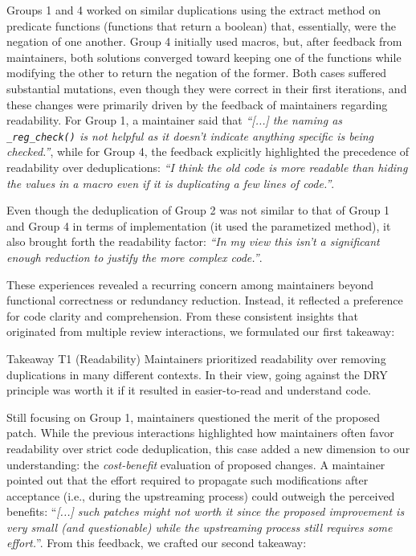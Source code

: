 \documentclass[10pt,conference]{IEEEtran}
\newenvironment{highlight-box}[1]{%
  \begin{tcolorbox}[colback=gray!10, colframe=gray!50!black, boxrule=0.5pt,
                    left=1mm, right=1mm, top=1mm, bottom=1mm, sharp corners]
  \textbf{#1:} \itshape}{\end{tcolorbox}}
\begin{document}
Groups 1 and 4 worked on similar duplications using the extract method on predicate functions (functions that return a boolean) that, essentially, were the negation of one another. Group 4 initially used macros, but, after feedback from maintainers, both solutions converged toward keeping one of the functions while modifying the other to return the negation of the former. Both cases suffered substantial mutations, even though they were correct in their first iterations, and these changes were primarily driven by the feedback of maintainers regarding readability. For Group 1, a maintainer said that \textit{``[...] the naming as \texttt{\_reg\_check()} is not helpful as it doesn't indicate anything specific is being checked.''}, while for Group 4, the feedback explicitly highlighted the precedence of readability over deduplications: \textit{``I think the old code is more readable than hiding the values in a macro even if it is duplicating a few lines of code.''}.

Even though the deduplication of Group 2 was not similar to that of Group 1 and Group 4 in terms of implementation (it used the parametized method), it also brought forth the readability factor: \textit{``In my view this isn't a significant enough reduction to justify the more complex code.''}.

These experiences revealed a recurring concern among maintainers beyond functional correctness or redundancy reduction. Instead, it reflected a preference for code clarity and comprehension. From these consistent insights that originated from multiple review interactions, we formulated our first takeaway:

\begin{highlight-box}{Takeaway T1 (Readability)}
Maintainers prioritized readability over removing duplications in many different contexts. In their view, going against the DRY principle was worth it if it resulted in easier-to-read and understand code.
\end{highlight-box}

Still focusing on Group 1, maintainers questioned the merit of the proposed patch. While the previous interactions highlighted how maintainers often favor readability over strict code deduplication, this case added a new dimension to our understanding: the \textit{cost-benefit} evaluation of proposed changes. A maintainer pointed out that the effort required to propagate such modifications after acceptance (i.e., during the upstreaming process) could outweigh the perceived benefits: ``\textit{[...] such patches might not worth it since the proposed improvement is very small (and questionable) while the upstreaming process still requires some effort.}''. From this feedback, we crafted our second takeaway:
\end{document}
